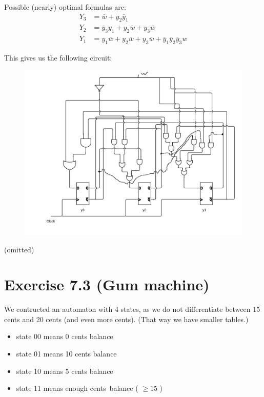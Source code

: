 \documentclass[10pt,a4paper]{scrartcl}
\newcommand{\subExercise}[1]{\vspace{0.5em} \noindent{\bf #1)}}
\begin{document}
\noindent Possible (nearly) optimal formulas are:
\begin{align*}
  Y_3 &= \bar w + y_2 \bar y_1 \\
  Y_2 &= \bar y_3 y_1 + y_2 \bar w + y_3 \bar w \\
  Y_1 &= y_1 \bar w + y_2 \bar w + y_3 \bar w + \bar y_1 \bar y_2 \bar y_3 w
\end{align*}


\noindent This gives us the following circuit:
\begin{figure}[h]
  \includegraphics[width=\linewidth]{images/exercise_7_2_circuit.png}
\end{figure}

\FloatBarrier
\subExercise{c} (omitted)

\FloatBarrier
\section*{Exercise 7.3 (Gum machine)}

We contructed an automaton with 4 states, as we do not differentiate between 15 cents and 20 cents (and even more cents). (That way we have smaller tables.) 
\begin{itemize}
\item state 00 means 0 cents balance
\item state 01 means 10 cents balance
\item state 10 means 5 cents balance
\item state 11 means \glqq enough cents\grqq \ balance ( $\geq 15$ )
\end{itemize}
\end{document}
